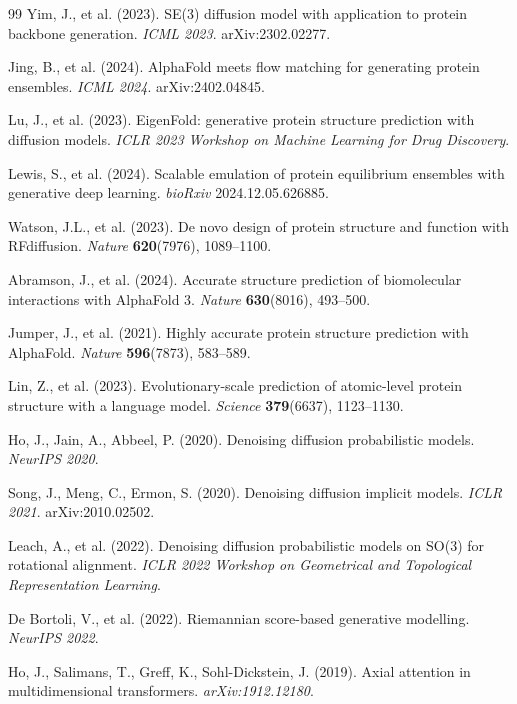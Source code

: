\documentclass[12pt,letterpaper]{article}
\begin{document}
\begin{thebibliography}{99}
Yim, J., et al. (2023).
SE(3) diffusion model with application to protein backbone generation.
\textit{ICML 2023}. arXiv:2302.02277.

Jing, B., et al. (2024).
AlphaFold meets flow matching for generating protein ensembles.
\textit{ICML 2024}. arXiv:2402.04845.

Lu, J., et al. (2023).
EigenFold: generative protein structure prediction with diffusion models.
\textit{ICLR 2023 Workshop on Machine Learning for Drug Discovery}.

Lewis, S., et al. (2024).
Scalable emulation of protein equilibrium ensembles with generative deep learning.
\textit{bioRxiv} 2024.12.05.626885.

Watson, J.L., et al. (2023).
De novo design of protein structure and function with RFdiffusion.
\textit{Nature} \textbf{620}(7976), 1089--1100.

Abramson, J., et al. (2024).
Accurate structure prediction of biomolecular interactions with AlphaFold 3.
\textit{Nature} \textbf{630}(8016), 493--500.

Jumper, J., et al. (2021).
Highly accurate protein structure prediction with AlphaFold.
\textit{Nature} \textbf{596}(7873), 583--589.

Lin, Z., et al. (2023).
Evolutionary-scale prediction of atomic-level protein structure with a language model.
\textit{Science} \textbf{379}(6637), 1123--1130.

Ho, J., Jain, A., Abbeel, P. (2020).
Denoising diffusion probabilistic models.
\textit{NeurIPS 2020}.

Song, J., Meng, C., Ermon, S. (2020).
Denoising diffusion implicit models.
\textit{ICLR 2021}. arXiv:2010.02502.

Leach, A., et al. (2022).
Denoising diffusion probabilistic models on SO(3) for rotational alignment.
\textit{ICLR 2022 Workshop on Geometrical and Topological Representation Learning}.

De Bortoli, V., et al. (2022).
Riemannian score-based generative modelling.
\textit{NeurIPS 2022}.

Ho, J., Salimans, T., Greff, K., Sohl-Dickstein, J. (2019).
Axial attention in multidimensional transformers.
\textit{arXiv:1912.12180}.


\end{thebibliography}
\end{document}
